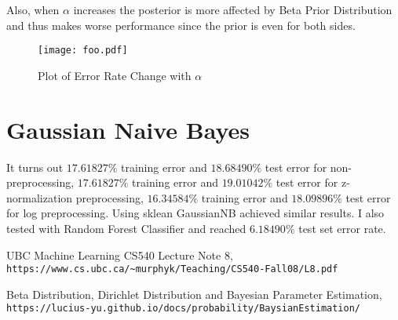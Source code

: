\documentclass[11pt, oneside]{article}
\begin{document}
Also, when $\alpha$ increases the posterior is more affected by Beta Prior Distribution and thus makes worse performance since the prior is even for both sides.

\begin{figure}[h]
\centering
\texttt{[image: foo.pdf]}
\caption{Plot of Error Rate Change with $\alpha$}
\end{figure}

\section{Gaussian Naive Bayes}

It turns out $17.61827\%$ training error and $18.68490\%$ test error for non-preprocessing, $17.61827\%$ training error and $19.01042\%$ test error for z-normalization preprocessing, $16.34584\%$ training error and $18.09896\%$ test error for log preprocessing. Using sklean GaussianNB achieved similar results. I also tested with Random Forest Classifier and reached $6.18490\%$ test set error rate.
 
\begin{thebibliography}{9}
UBC Machine Learning CS540 Lecture Note 8,
\\\texttt{https://www.cs.ubc.ca/\~{}murphyk/Teaching/CS540-Fall08/L8.pdf}

Beta Distribution, Dirichlet Distribution and Bayesian Parameter Estimation,
\\\texttt{https://lucius-yu.github.io/docs/probability/BaysianEstimation/}

\end{thebibliography}
\end{document}
